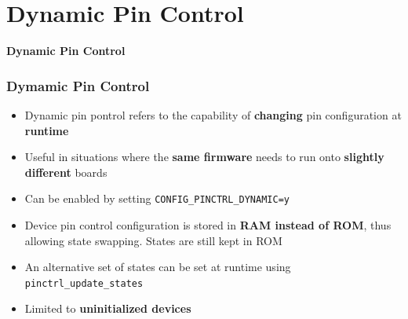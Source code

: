 \documentclass[handout]{beamer}
\begin{document}

\section{Dynamic Pin Control}

\begin{frame}
  \begin{center}
    \Huge \textbf{Dynamic Pin Control}
  \end{center}
\end{frame}

\begin{frame}
  \frametitle{Dymamic Pin Control}

  \begin{itemize}
    \item<1-> Dynamic pin pontrol refers to the capability of \textbf{changing}
          pin configuration at \textbf{runtime}
    \item<2-> Useful in situations where the \textbf{same firmware} needs to run
          onto \textbf{slightly different} boards
    \item<3-> Can be enabled by setting \texttt{CONFIG\_PINCTRL\_DYNAMIC=y}
    \item<4-> Device pin control configuration is stored in
          \textbf{RAM instead of ROM}, thus allowing state swapping. States are
          still kept in ROM
    \item<5-> An alternative set of states can be set at runtime using
          \texttt{pinctrl\_update\_states}
    \item<6-> Limited to \textbf{uninitialized devices}
  \end{itemize}
\end{frame}
\end{document}
